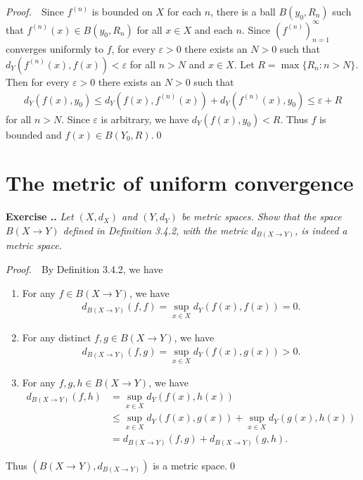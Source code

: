 \documentclass{book}
\newcommand{\pff}{\vspace{.25em}\noindent\emph{Proof.}~~}
\newcounter{Exercise}[section]
\renewcommand{\theExercise}{\thesection.\arabic{Exercise}.}
\newcommand{\new}{\vspace{1.5em}\noindent\textbf{Exercise \stepcounter{Exercise}\textbf{\theExercise}} }
\begin{document}
\pff Since $f^{(n)}$ is bounded on $X$ for each $n$, there is a ball $B(y_0, R_n)$ such that $f^{(n)}(x) \in B(y_0, R_n)$ for all $x \in X$ and each $n$. Since $(f^{(n)})_{n = 1}^{\infty}$ converges uniformly to $f$, for every $\varepsilon > 0$ there exists an $N > 0$ such that $d_Y(f^{(n)}(x), f(x)) < \varepsilon$ for all $n > N$ and $x \in X$. Let $R = \max\{R_n : n > N\}$. Then for every $\varepsilon > 0$ there exists an $N > 0$ such that
    \begin{align*}
        d_Y(f(x), y_0) \leq d_Y(f(x), f^{(n)}(x)) +  d_Y(f^{(n)}(x), y_0) \leq \varepsilon + R
    \end{align*}
for all $n > N$. Since $\varepsilon$ is arbitrary, we have $d_Y(f(x), y_0) < R$. Thus $f$ is bounded and $f(x) \in B(Y_0, R)$.\qed

\begin{comment}
\new\emph{Give an example to show that Proposition 3.3.6 fails if the phrase ``converges uniformly'' is replaced by ``converges pointwise''.
(Hint: some of the examples already given earlier will already work here.)}

\pff 
\end{comment}

\section{The metric of uniform convergence}

\new\emph{Let $(X, d_X)$ and $(Y, d_Y)$ be metric spaces. Show that the space $B(X \to Y)$ defined in Definition 3.4.2, with the metric $d_{B(X \to Y)}$, is indeed a metric space.}

\pff By Definition 3.4.2, we have
\begin{enumerate}
    \item For any $f \in B(X \to Y)$, we have
        \begin{align*}
            d_{B(X \to Y)} (f, f) = \sup_{x \in X} d_Y(f(x), f(x)) = 0.
        \end{align*}
    \item For any distinct $f, g \in B(X \to Y)$, we have
        \begin{align*}
            d_{B(X \to Y)} (f, g) = \sup_{x \in X} d_Y(f(x), g(x)) > 0.
        \end{align*}
    \item For any $f, g, h \in B(X \to Y)$, we have
        \begin{align*}
            d_{B(X \to Y)} (f, h)
            &= \sup_{x \in X} d_Y(f(x), h(x))\\
            &\leq \sup_{x \in X} d_Y(f(x), g(x)) + \sup_{x \in X} d_Y(g(x), h(x))\\
            &= d_{B(X \to Y)} (f, g) + d_{B(X \to Y)} (g, h).
        \end{align*}
\end{enumerate}
Thus $(B(X \to Y), d_{B(X \to Y)})$ is a metric space.\qed
\end{document}
